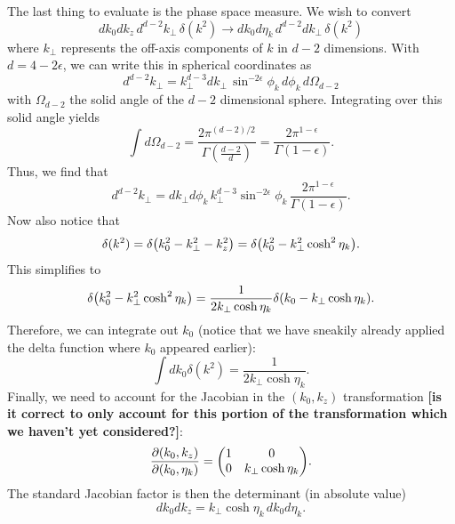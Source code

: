 \documentclass[11pt,twoside,reqno]{amsart}
\theoremstyle{plain}
\theoremstyle{remark}
\theoremstyle{definition}
\theoremstyle{remark}
\theoremstyle{definition}
\theoremstyle{definition}
\begin{document}
	The last thing to evaluate is the phase space measure. We wish to convert
	\begin{equation}
		dk_0 dk_z \,d^{d-2} k_\perp\,\delta(k^2) \to dk_0 d\eta_k\,d^{d-2}dk_\perp\,\delta(k^2)
	\end{equation}
	where $k_\perp$ represents the off-axis components of $k$ in $d-2$ dimensions. With $d = 4 - 2\epsilon$, we can write this in spherical coordinates as
	\begin{equation}
		d^{d-2}k_\perp = k_\perp^{d-3} d k_\perp\,\sin^{-2\epsilon}\phi_k\,d\phi_k \,d\Omega_{d-2}
	\end{equation}
	with $\Omega_{d-2}$ the solid angle of the $d-2$ dimensional sphere. Integrating over this solid angle yields \cite{schwartz_quantum_2014}
	\begin{equation}
		\int d\Omega_{d-2} = \frac{2\pi^{(d-2)/2}}{\Gamma(\frac{d-2}{d})} = \frac{2\pi^{1-\epsilon}}{\Gamma(1 - \epsilon)}.
	\end{equation}
	Thus, we find that
	\begin{equation}
		d^{d-2}k_\perp = dk_\perp d\phi_k \,k_\perp^{d-3}\sin^{-2\epsilon}\phi_k\,\frac{2\pi^{1-\epsilon}}{\Gamma(1-\epsilon)}.
	\end{equation}
	Now also notice that
	\begin{equation}
		\delta(k^2) = \delta\qty(k_0^2 - k_\perp^2 - k_z^2) = \delta\qty(k_0^2 - k_\perp^2 \cosh^2\eta_k).
	\end{equation}
	This simplifies to
	\begin{equation}
		\delta\qty(k_0^2 - k_\perp^2 \cosh^2\eta_k) = \frac{1}{2k_\perp \cosh\eta_k}\delta\qty(k_0 - k_\perp \cosh\eta_k).
	\end{equation}
	Therefore, we can integrate out $k_0$ (notice that we have sneakily already applied the delta function where $k_0$ appeared earlier):
	\begin{equation}
		\int dk_0 \delta(k^2) = \frac{1}{2k_\perp \cosh\eta_k}.
	\end{equation}
	Finally, we need to account for the Jacobian in the $(k_0, k_z)$ transformation {\color{red}\textbf{[is it correct to only account for this portion of the transformation which we haven't yet considered?]}}:
	\begin{equation}
		\frac{\partial(k_0, k_z)}{\partial(k_0, \eta_k)} = \mqty(
		1 & 0 \\ 
		0 & k_\perp \cosh\eta_k).
	\end{equation}
	The standard Jacobian factor is then the determinant (in absolute value)
	\begin{equation}
		dk_0 dk_z = k_\perp \cosh\eta_k \,dk_0 d\eta_k.
	\end{equation}
\end{document}
